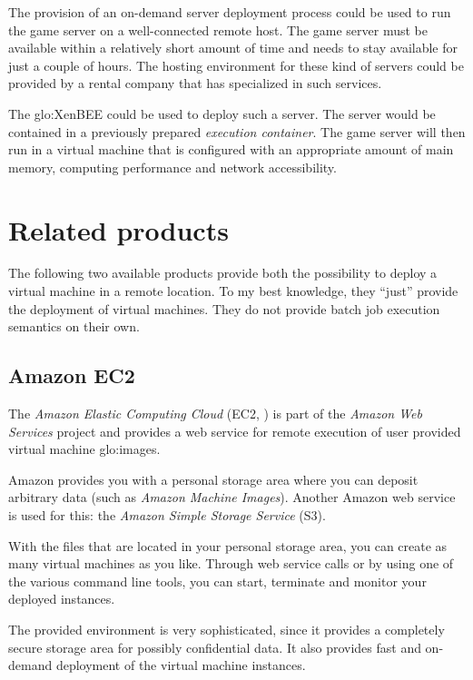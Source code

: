The provision of  an on-demand server deployment process  could be used to
run the game server on a  well-connected remote host. The game server must
be available  within a relatively short  amount of time and  needs to stay
available for  just a couple of  hours. The hosting  environment for these
kind of servers could be provided by a rental company that has specialized
in such services.

The \gls{glo:XenBEE}  could be used to  deploy such a  server.  The server
would   be   contained    in   a   previously   prepared   \emph{execution
  container}. The game  server will then run in a  virtual machine that is
configured  with   an  appropriate   amount  of  main   memory,  computing
performance and network accessibility.

\section{Related products}
\label{ref:related-products}

The  following two  available  products provide  both  the possibility  to
deploy a virtual machine in a remote location.  To my best knowledge, they
``just'' provide the  deployment of virtual machines. They  do not provide
batch job execution semantics on their own.

\subsection{Amazon EC2}

The \emph{Amazon Elastic Computing Cloud} (EC2, \cite{amazon-ec2}) is part
of the \emph{Amazon  Web Services} project and provides  a web service for
remote execution of user provided virtual machine \gls{glo:image}s.

Amazon provides  you with  a personal storage  area where you  can deposit
arbitrary data (such as  \emph{Amazon Machine Images}). Another Amazon web
service is used  for this: the \emph{Amazon Simple  Storage Service} (S3).

With the  files that are  located in your  personal storage area,  you can
create as many virtual machines as  you like. Through web service calls or
by using one  of the various command line tools,  you can start, terminate
and monitor your deployed instances.

The  provided  environment is  very  sophisticated,  since  it provides  a
completely secure  storage area for  possibly confidential data.   It also
provides fast and on-demand deployment of the virtual machine instances.

